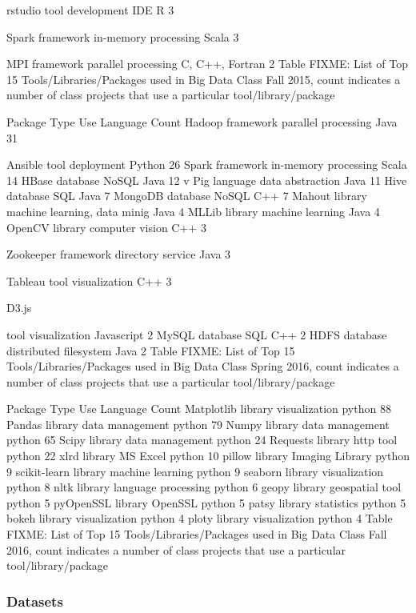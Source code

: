 \documentclass[9pt,twocolumn,twoside]{styles/osajnl}
\begin{document}
	rstudio
	tool
	development IDE
	R
	3

	Spark
	framework
	in-memory processing
	Scala
	3

	MPI
	framework
	parallel processing
	C, C++, Fortran
	2
	Table FIXME: List of Top 15 Tools/Libraries/Packages used in Big Data Class Fall 2015, count indicates a number of class projects that use a particular tool/library/package


Package
	Type
	Use
	Language
	Count
	Hadoop
	framework
	parallel processing
	Java
	31

	Ansible
	tool
	deployment
	Python
	26
	Spark
	framework
	in-memory processing
	Scala
	14
	HBase
	database
	NoSQL
	Java
	12
v	Pig
	language
	data abstraction
	Java
	11
	Hive
	database
	SQL
	Java
	7
	MongoDB
	database
	NoSQL
	C++
	7
	Mahout
	library
	machine learning, data minig
	Java
	4
	MLLib
	library
	machine learning
	Java
	4
	OpenCV
	library
	computer vision
	C++
	3

	Zookeeper
	framework
	directory service
	Java
	3

	Tableau
	tool
	visualization
	C++
	3

	D3.js

	tool
	visualization
	Javascript
	2
	MySQL
	database
	SQL
	C++
	2
	HDFS
	database
	distributed filesystem
	Java
	2
	Table FIXME: List of Top 15 Tools/Libraries/Packages used in Big Data Class Spring 2016, count indicates a number of class projects that use a particular tool/library/package


Package
	Type
	Use
	Language
	Count
	Matplotlib
	library
	visualization
	python
	88
	Pandas
	library
	data management
	python
	79
	Numpy
	library
	data management
	python
	65
	Scipy
	library
	data management
	python
	24
	Requests
	library
	http tool
	python
	22
	xlrd
	library
	MS Excel
	python
	10
	pillow
	library
	Imaging Library
	python
	9
	scikit-learn
	library
	machine learning
	python
	9
	seaborn
	library
	visualization
	python
	8
	nltk
	library
	language processing
	python
	6
	geopy
	library
	geospatial tool
	python
	5
	pyOpenSSL
	library
	OpenSSL
	python
	5
	patsy
	library
	statistics
	python
	5
	bokeh
	library
	visualization
	python
	4
	ploty
	library
	visualization
	python
	4
	Table FIXME: List of Top 15 Tools/Libraries/Packages used in Big Data Class Fall 2016, count indicates a number of class projects that use a particular tool/library/package
\subsubsection{Datasets}
\end{document}
